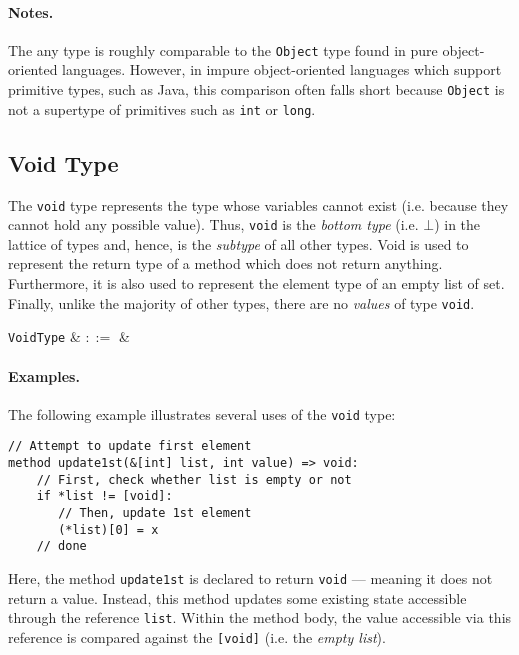 \paragraph{Notes.}  The any type is roughly comparable to the \lstinline{Object} type found in pure object-oriented languages.  However, in impure object-oriented languages which support primitive types, such as Java, this comparison often falls short because \lstinline{Object} is not a supertype of primitives such as \lstinline{int} or \lstinline{long}.


\subsection{Void Type}

The \lstinline{void} type represents the type whose variables cannot exist (i.e. because they cannot hold any possible value).  Thus, \lstinline{void} is the {\em bottom type} (i.e. $\bot$) in the lattice of types and, hence, is the {\em subtype} of all other types.  Void is used to represent the return type of a method which does not return anything.  Furthermore, it is also used to represent the element type of an empty list of set.  Finally, unlike the majority of other types, there are no {\em values} of type \lstinline{void}.

\begin{syntax}
   \verb+VoidType+ & $::=$ &  \\
\end{syntax}

\paragraph{Examples.} The following example illustrates several uses of the \lstinline{void} type:

\begin{lstlisting}
// Attempt to update first element
method update1st(&[int] list, int value) => void:
    // First, check whether list is empty or not
    if *list != [void]:
       // Then, update 1st element
       (*list)[0] = x
    // done
\end{lstlisting}

Here, the method \lstinline{update1st} is declared to return
\lstinline{void} --- meaning it does not return a value.  Instead,
this method updates some existing state accessible through the
reference \lstinline{list}.  Within the method body, the value
accessible via this reference is compared against the
\lstinline{[void]} (i.e. the {\em empty list}).

